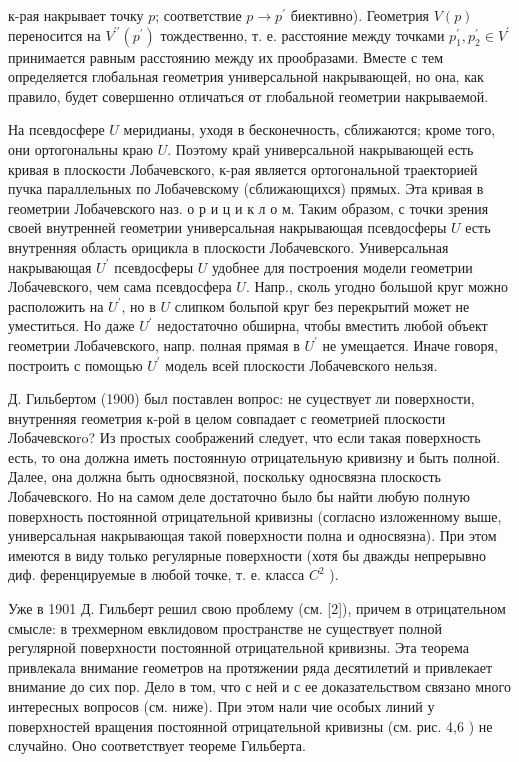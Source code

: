 \documentclass[10pt]{article}
\begin{document}
к-рая накрывает точку $p$; соответствие $p \rightarrow p^{\prime}$ биективно). Геометрия $V(p)$ переносится на $V^{\prime \prime}\left(p^{\prime}\right)$ тождественно, т. е. расстояние между точками $p_{1}^{\prime}, p_{2}^{\prime} \in V^{\prime}$ принимается равным расстоянию между их прообразами. Вместе с тем определяется глобальная геометрия универсальной накрывающей, но она, как правило, будет совершенно отличаться от глобальной геометрии накрываемой.

На псевдосфере $U$ меридианы, уходя в бесконечность, сближаются; кроме того, они ортогональны краю $U$. Поэтому край универсальной накрывающей есть кривая в плоскости Лобачевского, к-рая является ортогональной траекторией пучка параллельных по Лобачевскому (сближающихся) прямых. Эта кривая в геометрии Лобачевского наз. о р и ц и к л о м. Таким образом, с точки зрения своей внутренней геометрии универсальная накрывающая псевдосферы $U$ есть внутренняя область орицикла в плоскости Лобачевского. Универсальная накрывающая $U^{\prime}$ псевдосферы $U$ удобнее для построения модели геометрии Лобачевского, чем сама псевдосфера $U$. Напр., сколь угодно большой круг можно расположить на $U^{\prime}$, но в $U$ слипком больпой круг без перекрытий может не уместиться. Но даже $U^{\prime}$ недостаточно обширна, чтобы вместить любой объект геометрии Лобачевского, напр. полная прямая в $U^{\prime}$ не умещается. Иначе говоря, построить с помощью $U^{\prime}$ модель всей плоскости Лобачевского нельзя.

Д. Гильбертом (1900) был поставлен вопрос: не суцествует ли поверхности, внутренняя геометрия к-рой в целом совпадает с геометрией плоскости Лобачевскоro? Из простых соображений следует, что если такая поверхность есть, то она должна иметь постоянную отрицательную кривизну и быть полной. Далее, она должна быть односвязной, поскольку односвязна плоскость Лобачевского. Но на самом деле достаточно было бы найти любую полную поверхность постоянной отрицательной кривизны (согласно изложенному выше, универсальная накрывающая такой поверхности полна и односвязна). При этом имеются в виду только регулярные поверхности (хотя бы дважды непрерывно диф. ференцируемые в любой точке, т. е. класса $C^{2}$ ).

Уже в 1901 Д. Гильберт решил свою проблему (см. [2]), причем в отрицательном смысле: в трехмерном евклидовом пространстве не существует полной регулярной поверхности постоянной отрицательной кривизны. Эта теорема привлекала внимание геометров на протяжении ряда десятилетий и привлекает внимание до сих пор. Дело в том, что с ней и с ее доказательством связано много интересных вопросов (см. ниже). При этом нали чие особых линий у поверхностей вращения постоянной отрицательной кривизны (см. рис. 4,6 ) не случайно. Оно соответствует теореме Гильберта.
\end{document}
